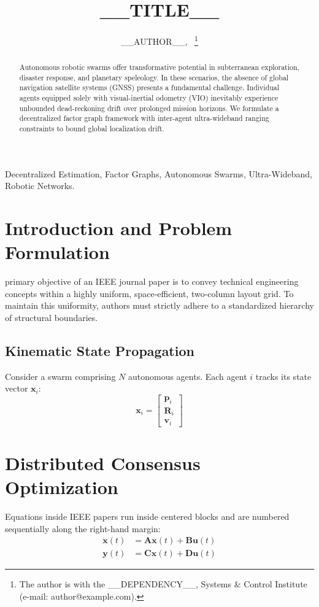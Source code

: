 \documentclass[10pt, journal]{IEEEtran}
\title{__TITLE__}
\author{__AUTHOR__,~\IEEEmembership{Member,~IEEE}%
\thanks{The author is with the __DEPENDENCY__, Systems & Control Institute (e-mail: author@example.com).}}
\begin{document}
\maketitle

\begin{abstract}
Autonomous robotic swarms offer transformative potential in subterranean exploration, disaster response, and planetary speleology. In these scenarios, the absence of global navigation satellite systems (GNSS) presents a fundamental challenge. Individual agents equipped solely with visual-inertial odometry (VIO) inevitably experience unbounded dead-reckoning drift over prolonged mission horizons. We formulate a decentralized factor graph framework with inter-agent ultra-wideband ranging constraints to bound global localization drift.
\end{abstract}

\begin{IEEEkeywords}
Decentralized Estimation, Factor Graphs, Autonomous Swarms, Ultra-Wideband, Robotic Networks.
\end{IEEEkeywords}

\section{Introduction and Problem Formulation}
 primary objective of an IEEE journal paper is to convey technical engineering concepts within a highly uniform, space-efficient, two-column layout grid. To maintain this uniformity, authors must strictly adhere to a standardized hierarchy of structural boundaries.

\subsection{Kinematic State Propagation}
Consider a swarm comprising $N$ autonomous agents. Each agent $i$ tracks its state vector $\mathbf{x}_i$:
\begin{equation}
	\mathbf{x}_i = \begin{bmatrix} \mathbf{p}_i \\ \mathbf{R}_i \\ \mathbf{v}_i \end{bmatrix}
\end{equation}

\section{Distributed Consensus Optimization}
Equations inside IEEE papers run inside centered blocks and are numbered sequentially along the right-hand margin:
\begin{align}
	\dot{\mathbf{x}}(t) &= \mathbf{A}\mathbf{x}(t) + \mathbf{B}\mathbf{u}(t) \label{eq:statespace} \\
	\mathbf{y}(t)       &= \mathbf{C}\mathbf{x}(t) + \mathbf{D}\mathbf{u}(t) \label{eq:output}
\end{align}
\end{document}
